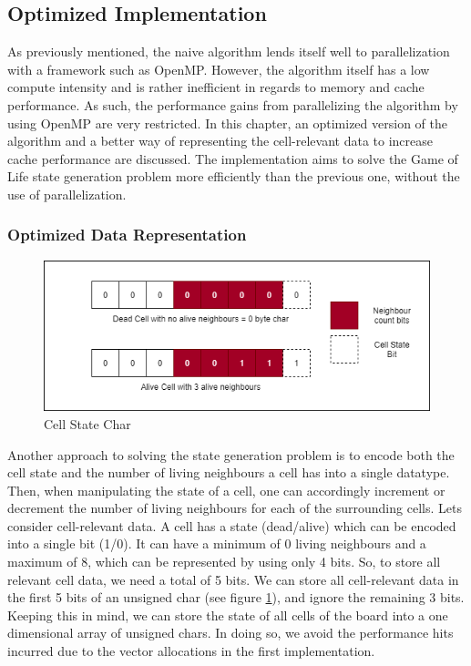 \documentclass[a4paper,english,12pt,twoside=false]{scrartcl} %
\begin{document}
\subsection{Optimized Implementation}

As previously mentioned, the naive algorithm lends itself well to parallelization with a framework such as OpenMP. However, the algorithm itself has a low compute intensity and is rather inefficient in regards to memory and cache performance. As such, the performance gains from parallelizing the algorithm by using OpenMP are very restricted. In this chapter, an optimized version of the algorithm and a better way of representing the cell-relevant data to increase cache performance are discussed. The implementation aims to solve the Game of Life state generation problem more efficiently than the previous one, without the use of parallelization.

\subsubsection{Optimized Data Representation}

\begin{figure}[tbh!]
	\centering
	\includegraphics[width=16cm]{imgs/cell-state.png}
	\caption{Cell State Char}
	\label{fig:cell-state}
\end{figure}

Another approach to solving the state generation problem is to encode both the cell state and the number of living neighbours a cell has into a single datatype. Then, when manipulating the state of a cell, one can accordingly increment or decrement the number of living neighbours for each of the surrounding cells. Lets consider cell-relevant data. A cell has a state (dead/alive) which can be encoded into a single bit (1/0). It can have a minimum of 0 living neighbours and a maximum of 8, which can be represented by using only 4 bits. So, to store all relevant cell data, we need a total of 5 bits. We can store all cell-relevant data in the first 5 bits of an unsigned char (see figure \ref{fig:cell-state}), and ignore the remaining 3 bits. Keeping this in mind, we can store the state of all cells of the board into a one dimensional array of unsigned chars. In doing so, we avoid the performance hits incurred due to the vector allocations in the first implementation.
\end{document}
